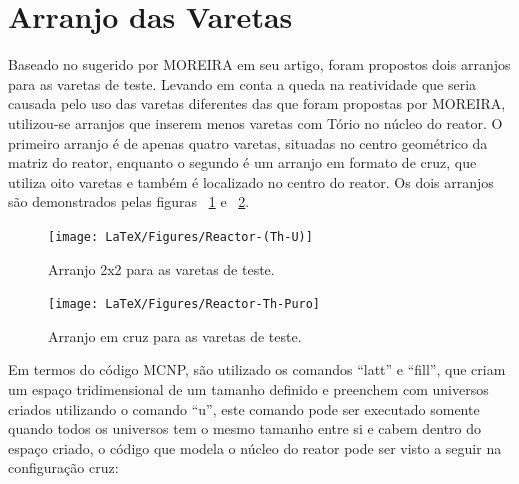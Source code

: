 \documentclass[
	12pt,				%
	openany,			%
	twoside,			%
	a4paper,			%
	english,			%
	french,				%
	spanish,			%
	brazil				%
	]{abntex2}
\begin{document}
\newpage

\section{Arranjo das Varetas}

Baseado no sugerido por MOREIRA em seu artigo, foram propostos dois
arranjos para as varetas de teste. Levando em conta a queda na reatividade
que seria causada pelo uso das varetas diferentes das que foram propostas
por MOREIRA, utilizou-se arranjos que inserem menos varetas com Tório
no núcleo do reator. O primeiro arranjo é de apenas quatro varetas,
situadas no centro geométrico da matriz do reator, enquanto o segundo
é um arranjo em formato de cruz, que utiliza oito varetas e também
é localizado no centro do reator. Os dois arranjos são demonstrados
pelas figuras ~\ref{2by2} e ~\ref{cross}.

\begin{figure}[htpb]
	\caption{\label{2by2} Arranjo 2x2 para as varetas de teste.}
	\begin{center}
	    \texttt{[image: LaTeX/Figures/Reactor-(Th-U)]}
	\end{center}
\end{figure}

\begin{figure}[htpb]
	\caption{\label{cross} Arranjo em cruz para as varetas de teste.}
	\begin{center}
	    \texttt{[image: LaTeX/Figures/Reactor-Th-Puro]}
	\end{center}
\end{figure}

Em termos do código MCNP, são utilizado os comandos ``latt'' e ``fill'', que criam um espaço tridimensional de um tamanho definido e preenchem com universos criados utilizando o comando ``u'', este comando pode ser executado somente quando todos os universos tem o mesmo tamanho entre si e cabem dentro do espaço criado, o código que modela o núcleo do reator pode ser visto a seguir na configuração cruz:
\end{document}
